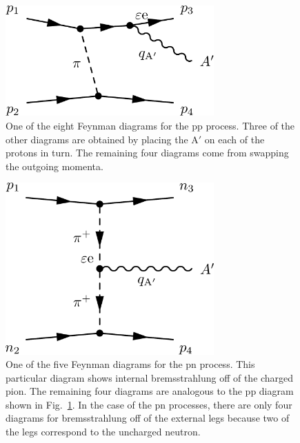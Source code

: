 \documentclass[nofootinbib,prd,superscriptaddress,twocolumn]{revtex4}
\newcommand{\Aprime}{\mathrm{A}'}
\begin{document}
\begin{figure}
\includegraphics[width=8cm]{ppdiagram.pdf}
\caption{One of the eight Feynman diagrams for the pp process. Three of the other diagrams are obtained by 
placing the $\Aprime$ on each of the protons in turn. The remaining four diagrams come from swapping the outgoing 
momenta.}
\label{fig:ppdiagram}
\end{figure}

\begin{figure}
\includegraphics[width=8cm]{npdiagram.pdf}
\caption{One of the five Feynman diagrams for the pn process. This particular diagram shows 
internal bremsstrahlung off of the charged pion. The remaining four diagrams are analogous to the 
pp diagram shown in Fig.~\ref{fig:ppdiagram}. In the case of the pn processes, there are only four 
diagrams for bremsstrahlung off of the external legs because two of the legs correspond to the 
uncharged neutron.}
\label{fig:npdiagram}
\end{figure}
\end{document}
